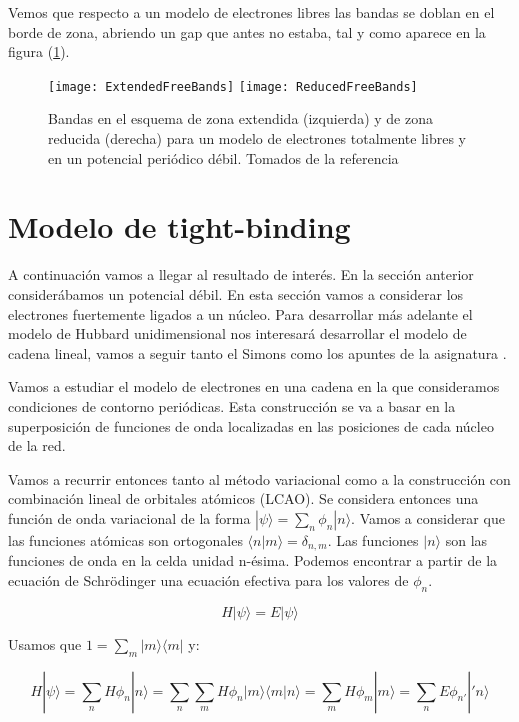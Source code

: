 \documentclass{article} %
\begin{document}
Vemos que respecto a un modelo de electrones libres las bandas se doblan en el borde de zona, abriendo un gap que antes no estaba, tal y como aparece en la figura (\ref{fig:bandasFree}).

\begin{figure}[h!]
\begin{center}
\texttt{[image: ExtendedFreeBands]}
\texttt{[image: ReducedFreeBands]}
\caption{Bandas en el esquema de zona extendida (izquierda) y de zona reducida (derecha) para un modelo de electrones totalmente libres y en un potencial periódico débil. Tomados de la referencia \cite{SolidStateCourse}}
\label{fig:bandasFree}
\end{center}
\end{figure}
\section{Modelo de tight-binding}

A continuación vamos a llegar al resultado de interés. En la sección anterior considerábamos un potencial débil. En esta sección vamos a considerar los electrones fuertemente ligados a un núcleo. Para desarrollar más adelante el modelo de Hubbard unidimensional nos interesará desarrollar el modelo de cadena lineal, vamos a seguir tanto el Simons \cite{simon2013oxford} como los apuntes de la asignatura \cite{apuntes}.

Vamos a estudiar el modelo de electrones en una cadena en la que consideramos condiciones de contorno periódicas. Esta construcción se va a basar en la superposición de funciones de onda localizadas en las posiciones de cada núcleo de la red.

Vamos a recurrir entonces tanto al método variacional como a la construcción con combinación lineal de orbitales atómicos (LCAO). Se considera entonces una función de onda variacional de la forma $|\psi\rangle = \sum_n \phi_n |n\rangle$. Vamos a considerar que las funciones atómicas son ortogonales $\langle n | m \rangle = \delta_{n,m}$. Las funciones $|n\rangle$ son las funciones de onda en la celda unidad n-ésima. Podemos encontrar a partir de la ecuación de Schrödinger una ecuación efectiva para los valores de $\phi_n$.

$$
H|\psi\rangle = E|\psi\rangle
$$

Usamos que $1 = \sum_m |m\rangle\langle m|$ y:

$$
H|\psi\rangle = \sum_n H\phi_n|n\rangle = \sum_n \sum_m H \phi_n |m\rangle\langle m|n\rangle = \sum_m H \phi_m |m\rangle = \sum_n E \phi_{n'} |'n\rangle
$$
\end{document}
